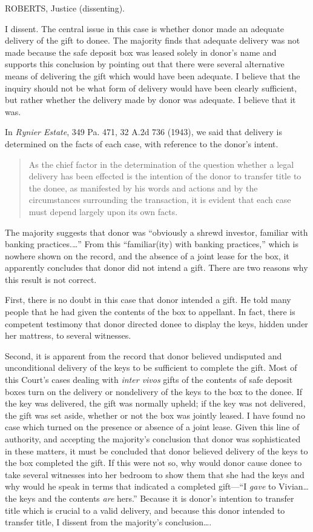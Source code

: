 ROBERTS, Justice (dissenting).

I dissent. The central issue in this case is whether donor made an adequate
delivery of the gift to donee. The majority finds that adequate delivery was
not made because the safe deposit box was leased solely in donor's name and
supports this conclusion by pointing out that there were several alternative
means of delivering the gift which would have been adequate. I believe that the
inquiry should not be what form of delivery would have been clearly sufficient,
but rather whether the delivery made by donor was adequate. I believe that it
was.

 In \emph{Rynier Estate}, 349 Pa. 471, 32 A.2d 736 (1943), we said that delivery
is
determined on the facts of each case, with reference to the donor's intent.
\begin{quote}
As the chief factor in the determination of the question whether a legal
delivery has been effected is the intention of the donor to transfer title to
the donee, as manifested by his words and actions and by the circumstances
surrounding the transaction, it is evident that each case must depend largely
upon its own facts.
\end{quote}

The majority suggests that donor was ``obviously a shrewd investor,
familiar with banking practices.\ldots'' From this ``familiar(ity) with banking
practices,'' which is nowhere shown on the record, and the absence of a joint
lease for the box, it apparently concludes that donor did not intend a gift.
There are two reasons why this result is not correct.

 First, there is no doubt in this case that donor intended a gift. He told many
people that he had given the contents of the box to appellant. In fact, there
is competent testimony that donor directed donee to display the keys, hidden
under her mattress, to several witnesses.

Second, it is apparent from the record that donor believed undisputed and
unconditional delivery of the keys to be sufficient to complete the gift. Most
of this Court's cases dealing with \textit{inter vivos} gifts of the contents
of safe deposit boxes turn on the delivery or nondelivery of the keys to the
box to the donee. If the key was delivered, the gift was normally upheld; if
the key was not delivered, the gift was set aside, whether or not the box was
jointly leased. I have found no case which turned on the presence or absence of
a joint lease. Given this line of authority, and accepting the majority's
conclusion that donor was sophisticated in these matters, it must be concluded
that donor believed delivery of the keys to the box completed the gift. If this
were not so, why would donor cause donee to take several witnesses into her
bedroom to show them that she had the keys and why would he speak in terms that
indicated a completed gift---``I \textit{gave} to Vivian\ldots the keys and the
contents \textit{are} hers.'' Because it is donor's intention to transfer title
which is crucial to a valid delivery, and because this donor intended to
transfer title, I dissent from the majority's conclusion\dots.

